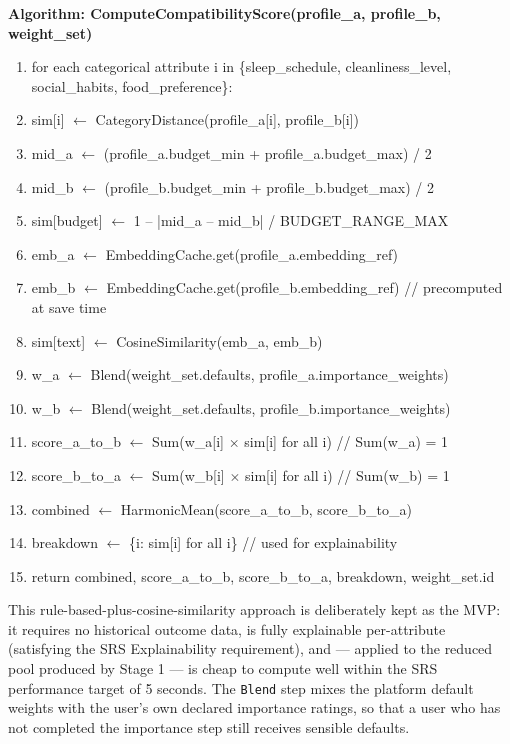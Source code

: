 \documentclass[12pt,a4paper]{report}
\begin{document}
\textbf{Algorithm: ComputeCompatibilityScore(profile\_a, profile\_b, weight\_set)}
\begin{enumerate}[label=\arabic*., itemsep=0pt]
    \ttfamily
    \item for each categorical attribute i in
    \{sleep\_schedule, cleanliness\_level, social\_habits, food\_preference\}:
    \item \quad sim[i] $\leftarrow$ CategoryDistance(profile\_a[i], profile\_b[i])
    \item mid\_a $\leftarrow$ (profile\_a.budget\_min + profile\_a.budget\_max) / 2
    \item mid\_b $\leftarrow$ (profile\_b.budget\_min + profile\_b.budget\_max) / 2
    \item sim[budget] $\leftarrow$ 1 -- |mid\_a -- mid\_b| / BUDGET\_RANGE\_MAX
    \item emb\_a $\leftarrow$ EmbeddingCache.get(profile\_a.embedding\_ref)
    \item emb\_b $\leftarrow$ EmbeddingCache.get(profile\_b.embedding\_ref)
    \hfill // precomputed at save time
    \item sim[text] $\leftarrow$ CosineSimilarity(emb\_a, emb\_b)
    \item w\_a $\leftarrow$ Blend(weight\_set.defaults, profile\_a.importance\_weights)
    \item w\_b $\leftarrow$ Blend(weight\_set.defaults, profile\_b.importance\_weights)
    \item score\_a\_to\_b $\leftarrow$ Sum(w\_a[i] $\times$ sim[i] for all i)
    \hfill // Sum(w\_a) = 1
    \item score\_b\_to\_a $\leftarrow$ Sum(w\_b[i] $\times$ sim[i] for all i)
    \hfill // Sum(w\_b) = 1
    \item combined $\leftarrow$ HarmonicMean(score\_a\_to\_b, score\_b\_to\_a)
    \item breakdown $\leftarrow$ \{i: sim[i] for all i\}
    \hfill // used for explainability
    \item return combined, score\_a\_to\_b, score\_b\_to\_a, breakdown,
    weight\_set.id
\end{enumerate}

\vspace{4mm}

This rule-based-plus-cosine-similarity approach is deliberately kept as the MVP: it requires no historical outcome data, is fully explainable per-attribute (satisfying the SRS Explainability requirement), and --- applied to the reduced pool produced by Stage 1 --- is cheap to compute well within the SRS performance target of 5 seconds. The \texttt{Blend} step mixes the platform default weights with the user's own declared importance ratings, so that a user who has not completed the importance step still receives sensible defaults.
\end{document}
